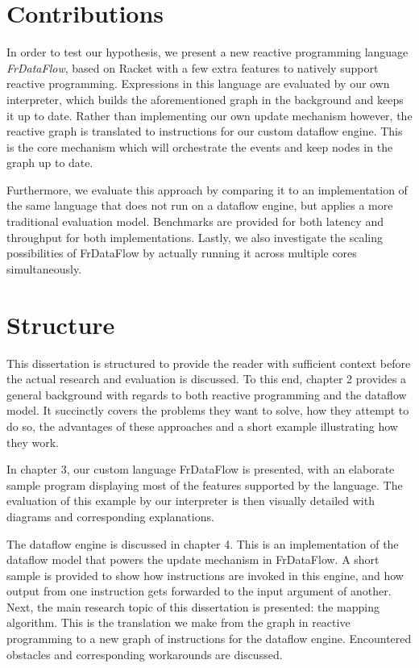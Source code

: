 \section{Contributions}

In order to test our hypothesis, we present a new reactive programming language \textit{FrDataFlow}, based on Racket with a few extra features to natively support reactive programming. Expressions in this language are evaluated by our own interpreter, which builds the aforementioned graph in the background and keeps it up to date. Rather than implementing our own update mechanism however, the reactive graph is translated to instructions for our custom dataflow engine. This is the core mechanism which will orchestrate the events and keep nodes in the graph up to date.

Furthermore, we evaluate this approach by comparing it to an implementation of the same language that does not run on a dataflow engine, but applies a more traditional evaluation model. Benchmarks are provided for both latency and throughput for both implementations. Lastly, we also investigate the scaling possibilities of FrDataFlow by actually running it across multiple cores simultaneously. 

\section{Structure}

This dissertation is structured to provide the reader with sufficient context before the actual research and evaluation is discussed. To this end, chapter 2 provides a general background with regards to both reactive programming and the dataflow model. It succinctly covers the problems they want to solve, how they attempt to do so, the advantages of these approaches and a short example illustrating how they work.

In chapter 3, our custom language FrDataFlow is presented, with an elaborate sample program displaying most of the features supported by the language. The evaluation of this example by our interpreter is then visually detailed with diagrams and corresponding explanations. 

The dataflow engine is discussed in chapter 4. This is an implementation of the dataflow model that powers the update mechanism in FrDataFlow. A short sample is provided to show how instructions are invoked in this engine, and how output from one instruction gets forwarded to the input argument of another. Next, the main research topic of this dissertation is presented: the mapping algorithm. This is the translation we make from the graph in reactive programming to a new graph of instructions for the dataflow engine. Encountered obstacles and corresponding workarounds are discussed.

